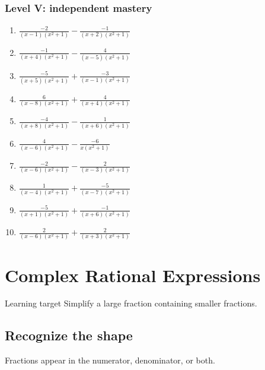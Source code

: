 \documentclass[11pt,oneside]{book}
\begin{document}
\subsection*{Level V: independent mastery}
\begin{enumerate}[leftmargin=*,label=\textbf{\arabic*.},itemsep=0.65\baselineskip]
\item $\displaystyle \frac{-2}{\left(x - 1\right) \left(x^{2} + 1\right)}-\frac{-1}{\left(x + 2\right) \left(x^{2} + 1\right)}$
\item $\displaystyle \frac{-1}{\left(x + 4\right) \left(x^{2} + 1\right)}-\frac{4}{\left(x - 5\right) \left(x^{2} + 1\right)}$
\item $\displaystyle \frac{-5}{\left(x + 5\right) \left(x^{2} + 1\right)}+\frac{-3}{\left(x - 1\right) \left(x^{2} + 1\right)}$
\item $\displaystyle \frac{6}{\left(x - 8\right) \left(x^{2} + 1\right)}+\frac{4}{\left(x + 4\right) \left(x^{2} + 1\right)}$
\item $\displaystyle \frac{-4}{\left(x + 8\right) \left(x^{2} + 1\right)}-\frac{1}{\left(x + 6\right) \left(x^{2} + 1\right)}$
\item $\displaystyle \frac{4}{\left(x - 6\right) \left(x^{2} + 1\right)}-\frac{-6}{x \left(x^{2} + 1\right)}$
\item $\displaystyle \frac{-2}{\left(x - 6\right) \left(x^{2} + 1\right)}-\frac{2}{\left(x - 3\right) \left(x^{2} + 1\right)}$
\item $\displaystyle \frac{1}{\left(x - 4\right) \left(x^{2} + 1\right)}+\frac{-5}{\left(x - 7\right) \left(x^{2} + 1\right)}$
\item $\displaystyle \frac{-5}{\left(x + 1\right) \left(x^{2} + 1\right)}+\frac{-1}{\left(x + 6\right) \left(x^{2} + 1\right)}$
\item $\displaystyle \frac{2}{\left(x - 6\right) \left(x^{2} + 1\right)}+\frac{2}{\left(x + 3\right) \left(x^{2} + 1\right)}$
\end{enumerate}
\chapter{Complex Rational Expressions}
\begin{rulebox}{Learning target}
Simplify a large fraction containing smaller fractions.
\end{rulebox}
\section{Recognize the shape}
Fractions appear in the numerator, denominator, or both.
\end{document}
